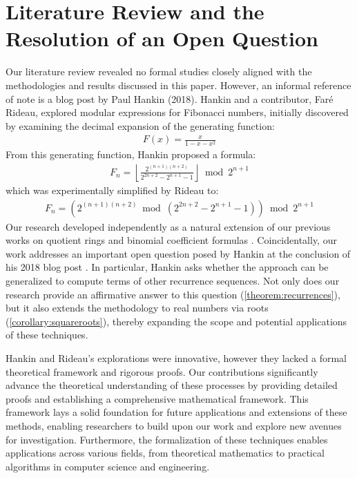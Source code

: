\documentclass[11pt,reqno]{article}
\theoremstyle{plain}
\theoremstyle{definition}
\newcommand{\floor}[1]{\left\lfloor #1 \right\rfloor}
\begin{document}
\section{Literature Review and the Resolution of an Open Question}
Our literature review revealed no formal studies closely aligned with the methodologies and results discussed in this paper. However, an informal reference of note is a blog post by Paul Hankin \cite{hankin2018fibonacci2} (2018). Hankin and a contributor, Faré Rideau, explored modular expressions for Fibonacci numbers, initially discovered by examining the decimal expansion of the generating function:
\begin{align*}
F(x) = \frac{x}{1-x-x^2}
\end{align*}
From this generating function, Hankin proposed a formula:
\begin{align*}
F_n = \floor{\frac{2^{(n+1)(n+2)}}{2^{2n+2} - 2^{n+1} - 1}} \bmod{2^{n+1}}
\end{align*}
which was experimentally simplified by Rideau to:
\begin{align*}
F_n = (2^{(n+1)(n+2)} \bmod{(2^{2n+2} - 2^{n+1} - 1)}) \bmod{2^{n+1}}
\end{align*}
Our research developed independently as a natural extension of our previous works on quotient rings \cite{shunia2023polynomial} and binomial coefficient formulas \cite{shunia2023simple}. Coincidentally, our work addresses an important open question posed by Hankin at the conclusion of his 2018 blog post \cite{hankin2018fibonacci2}. In particular, Hankin asks whether the approach can be generalized to compute terms of other recurrence sequences. Not only does our research provide an affirmative answer to this question (\cref{theorem:recurrences}), but it also extends the methodology to real numbers via roots (\cref{corollary:squareroots}), thereby expanding the scope and potential applications of these techniques.

Hankin and Rideau's explorations were innovative, however they lacked a formal theoretical framework and rigorous proofs. Our contributions significantly advance the theoretical understanding of these processes by providing detailed proofs and establishing a comprehensive mathematical framework. This framework lays a solid foundation for future applications and extensions of these methods, enabling researchers to build upon our work and explore new avenues for investigation. Furthermore, the formalization of these techniques enables applications across various fields, from theoretical mathematics to practical algorithms in computer science and engineering.
\end{document}
